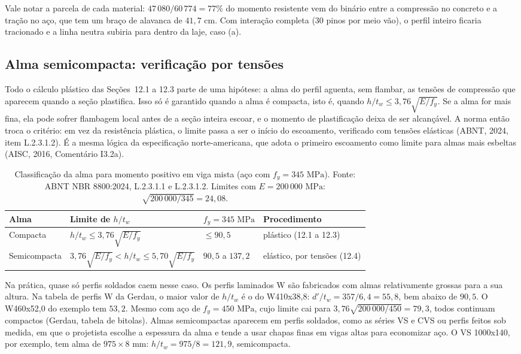 \documentclass[11pt,a4paper]{article}
\begin{document}
Vale notar a parcela de cada material: $47\,080/60\,774 = 77\%$ do momento resistente vem do binário entre a compressão no concreto e a tração no aço, que tem um braço de alavanca de $41{,}7\text{ cm}$. Com interação completa ($30$ pinos por meio vão), o perfil inteiro ficaria tracionado e a linha neutra subiria para dentro da laje, caso (a).

\subsection{Alma semicompacta: verificação por tensões}

Todo o cálculo plástico das Seções~12.1 a 12.3 parte de uma hipótese: a alma do perfil aguenta, sem flambar, as tensões de compressão que aparecem quando a seção plastifica. Isso só é garantido quando a alma é compacta, isto é, quando $h/t_w \le 3{,}76\sqrt{E/f_y}$. Se a alma for mais fina, ela pode sofrer flambagem local antes de a seção inteira escoar, e o momento de plastificação deixa de ser alcançável. A norma então troca o critério: em vez da resistência plástica, o limite passa a ser o início do escoamento, verificado com tensões elásticas (ABNT, 2024, item L.2.3.1.2). É a mesma lógica da especificação norte-americana, que adota o primeiro escoamento como limite para almas mais esbeltas (AISC, 2016, Comentário I3.2a).

\begin{table}[!htbp]
  \centering
  \caption{Classificação da alma para momento positivo em viga mista (aço com $f_y = 345\text{ MPa}$). Fonte: ABNT NBR 8800:2024, L.2.3.1.1 e L.2.3.1.2. Limites com $E = 200\,000\text{ MPa}$: $\sqrt{200\,000/345} = 24{,}08$.}
  \label{tab:alma-positiva}
  \small
  \begin{tabularx}{\linewidth}{lXll}
    \toprule
    \textbf{Alma} & \textbf{Limite de $h/t_w$} & $f_y = 345\text{ MPa}$ & \textbf{Procedimento} \\
    \midrule
    Compacta & $h/t_w \le 3{,}76\sqrt{E/f_y}$ & $\le 90{,}5$ & plástico (12.1 a 12.3) \\
    Semicompacta & $3{,}76\sqrt{E/f_y} < h/t_w \le 5{,}70\sqrt{E/f_y}$ & $90{,}5$ a $137{,}2$ & elástico, por tensões (12.4) \\
    \bottomrule
  \end{tabularx}
\end{table}

Na prática, quase só perfis soldados caem nesse caso. Os perfis laminados W são fabricados com almas relativamente grossas para a sua altura. Na tabela de perfis W da Gerdau, o maior valor de $h/t_w$ é o do W410x38,8: $d'/t_w = 357/6{,}4 = 55{,}8$, bem abaixo de $90{,}5$. O W460x52,0 do exemplo tem $53{,}2$. Mesmo com aço de $f_y = 450\text{ MPa}$, cujo limite cai para $3{,}76\sqrt{200\,000/450} = 79{,}3$, todos continuam compactos (Gerdau, tabela de bitolas). Almas semicompactas aparecem em perfis soldados, como as séries VS e CVS ou perfis feitos sob medida, em que o projetista escolhe a espessura da alma e tende a usar chapas finas em vigas altas para economizar aço. O VS 1000x140, por exemplo, tem alma de $975 \times 8\text{ mm}$: $h/t_w = 975/8 = 121{,}9$, semicompacta.
\end{document}
